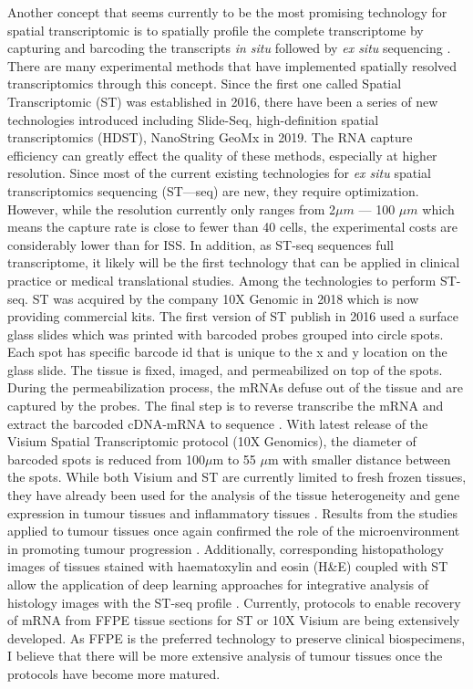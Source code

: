 Another concept that seems currently to be the most promising technology for spatial transcriptomic is to spatially profile the complete transcriptome by capturing and barcoding the transcripts \textit{in situ} followed by \textit{ex situ} sequencing \cite{asp2020spatially}. There are many experimental methods that have implemented spatially resolved transcriptomics through this concept. Since the first one called Spatial Transcriptomic (ST) was established in 2016, there have been a series of new technologies introduced including Slide-Seq, high-definition spatial transcriptomics (HDST), NanoString GeoMx in 2019. The RNA capture efficiency can greatly effect the quality of these methods, especially at higher resolution. Since most of the current existing technologies for \textit{ex situ} spatial transcriptomics sequencing (ST—seq) are new, they require optimization. However, while the resolution currently only ranges from 2$\mu m$ — 100 $\mu m$ which means the capture rate is close to fewer than 40 cells, the experimental costs are considerably lower than for ISS. In addition, as ST-seq sequences full transcriptome, it likely will be the first technology that can be applied in clinical practice or medical translational studies.                
Among the technologies to perform ST-seq. ST was acquired by the company 10X Genomic in 2018 which is now providing commercial kits. The first version of ST publish in 2016 used a surface glass slides which was printed with barcoded probes grouped into circle spots. Each spot has specific barcode id that is unique to the x and y location on the glass slide. The tissue is fixed, imaged, and permeabilized on top of the spots. During the permeabilization process, the mRNAs defuse out of the tissue and are captured by the probes. The final step is to reverse transcribe the mRNA and extract the barcoded cDNA-mRNA to sequence \cite{staahl2016visualization, berglund2018spatial}. With latest release of the Visium Spatial Transcriptomic protocol (10X Genomics), the diameter of barcoded spots is reduced from  100$\mu$m to 55 $\mu$m with smaller distance between the spots. While both  Visium  and ST are currently limited to fresh frozen tissues, they have already been used for the analysis of the tissue heterogeneity and gene expression in tumour tissues \cite{berglund2018spatial, thrane2018spatially, moncada2019integrating,ji2020multimodal, yoosuf2020identification} and inflammatory tissues \cite{carlberg2019exploring}. Results from the studies applied to tumour tissues once again confirmed the role of the microenvironment in promoting tumour progression \cite{thrane2018spatially, moncada2019integrating}. Additionally, corresponding histopathology images of tissues stained with haematoxylin and eosin (H\&E) coupled with ST allow the application of deep learning approaches for integrative analysis of histology images with the ST-seq profile \cite{he2020integrating, tan2019spacell}. Currently, protocols to enable recovery of mRNA from FFPE tissue sections for ST or 10X Visium are being extensively developed. As FFPE is the preferred technology to preserve clinical biospecimens, I believe that there will be more extensive analysis of tumour tissues
once the protocols have become more matured.           

